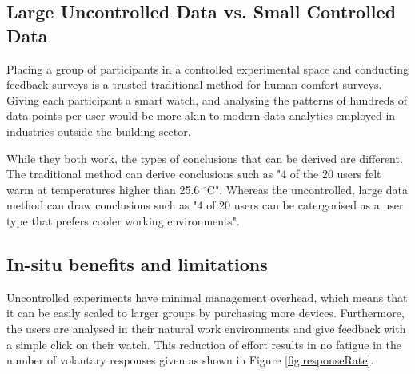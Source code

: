 
\subsection{Large Uncontrolled Data vs. Small Controlled Data}



Placing a group of participants in a controlled experimental space and conducting feedback surveys is a trusted traditional method for human comfort surveys. Giving each participant a smart watch, and analysing the patterns of hundreds of data points per user would be more akin to modern data analytics employed in industries outside the building sector. 

While they both work, the types of conclusions that can be derived are different. The traditional method can derive conclusions such as "4 of the 20 users felt warm at temperatures higher than 25.6 $^\circ$C". Whereas the uncontrolled, large data method can draw conclusions such as "4 of 20 users can be catergorised as a user type that prefers cooler working environments".



\subsection{In-situ benefits and limitations}

Uncontrolled experiments have minimal management overhead, which means that it can be easily scaled to larger groups by purchasing more devices. Furthermore, the users are analysed in their natural work environments and give feedback with a simple click on their watch. This reduction of effort results in no fatigue in the number of volantary responses given as shown in Figure \ref{fig:responseRate}.

